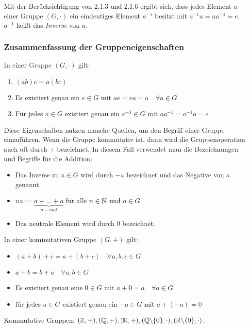 \noindent Mit der Berücksichtigung von 2.1.3 und 2.1.6 ergibt sich, dass jedes Element $ a $ einer Gruppe $ (G,\cdot) $ ein eindeutiges Element $ a^{-1} $ besitzt mit $ a^{-1}a = aa^{-1} = e $. $ a^{-1} $ heißt das \emph{Inverse} von $ a $.

\subsubsection{Zusammenfassung der Gruppeneigenschaften}

In einer Gruppe $ (G, \cdot ) $ gilt:
\begin{enumerate}
	\item
		$ (ab)c = a(bc) $
	\item
		Es existiert genau ein $  e \in G $ mit $ ae = ea = a \quad \forall a \in G $
	\item
		Für jedes $ a \in G $ existiert genau ein $  a^{-1} \in G $ mit $ aa^{-1} = a^{-1}a = e $
\end{enumerate}
Diese Eigenschaften nutzen manche Quellen, um den Begriff einer Gruppe einzuführen. 
Wenn die Gruppe kommutativ ist, dann wird die Gruppenoperation auch oft durch $ + $ bezeichnet. In diesem Fall verwendet man die Bezeichnungen und Begriffe für die Addition:
\begin{itemize}
	\item Das Inverse zu $ a \in G $ wird durch $ -a $ bezeichnet und das Negative von $ a $ genannt.
	\item $ na := \underbrace{a+ \ldots + a}_{n-mal} $ für alle $ n \in \mathbb N $ und $ a \in G $
	\item Das neutrale Element wird durch $ 0 $ bezeichnet.
\end{itemize}
In einer kommutativen Gruppe $ (G, +) $ gilt:
\begin{itemize}
	\item
		$ (a+b)+c = a+(b+c) \quad \forall a,b,c \in G $
	\item
		$ a+b = b+a \quad \forall a,b \in G $
	\item
		Es existiert genau eine $ 0 \in G $ mit $ a+0 = a \quad \forall a \in G $
	\item
		für jedes $ a \in G $ existiert genau ein $ -a \in G $ mit $ a+ (-a) = 0 $
\end{itemize}

\begin{bsp}
	Kommutative Gruppen: \hfill $ (\mathbb{Z}, +), \hfill (\mathbb{Q}, +), \hfill (\mathbb{R}, +), \hfill (\mathbb{Q} \backslash \{0\}, \cdot ), \hfill (\mathbb{R} \backslash \{0\}, \cdot ) $.
\end{bsp}


